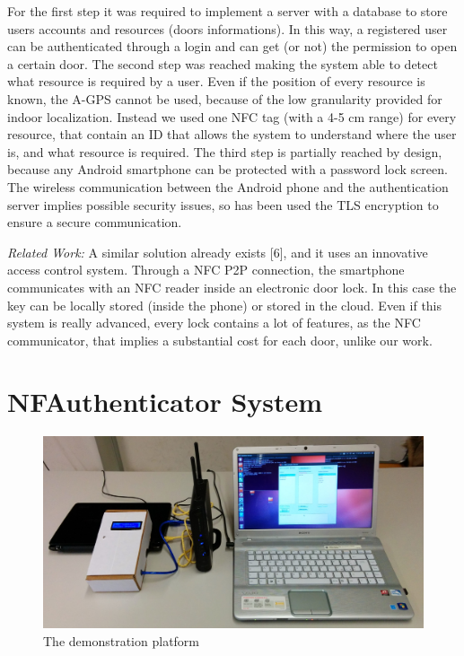 \documentclass[conference]{IEEEtran}
\begin{document}
For the first step it was required to implement a server with a database to store users accounts and resources (doors informations). In this way, a registered user can be authenticated through a login and can get (or not) the permission to open a certain door.
The second step was reached making the system able to detect what resource is required by a user. Even if the position of every resource is known, the A-GPS cannot be used, because of the low granularity provided for indoor localization. Instead we used one NFC tag (with a 4-5 cm range) for every resource, that contain an ID that allows the system to understand where the user is, and what resource is required.
The third step is partially reached by design, because any Android smartphone can be protected with a password lock screen. The wireless communication between the Android phone and the authentication server implies possible security issues, so has been used the TLS encryption to ensure a secure communication.

\textit{Related Work:} A similar solution already exists [6], and it uses an innovative access control system. Through a NFC P2P connection, the smartphone communicates with an NFC reader inside an electronic door lock. In this case the key can be locally stored (inside the phone) or stored in the cloud. Even if this system is really advanced, every lock contains a lot of features, as the NFC communicator, that implies a substantial cost for each door, unlike our work.

\section{NFAuthenticator System}

\begin{figure}[h]
\centering
\includegraphics[scale=0.08]{fig8}
\caption{The demonstration platform}
\label{architecture}
\end{figure}
\end{document}
